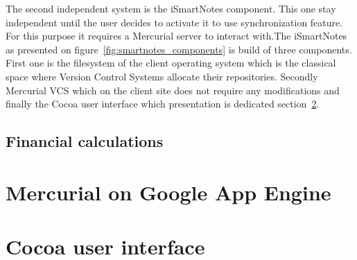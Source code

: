 The second independent system is the iSmartNotes component. This one stay independent until the user decides to activate it to use synchronization feature. For this purpose it requires a Mercurial server to interact with.The iSmartNotes as presented on figure~\ref{fig:smartnotes_components} is build of three components. First one is the filesystem of the client operating system which is the classical space where Version Control Systems allocate their repositories. Secondly Mercurial VCS which on the client site does not require any modifications and finally the Cocoa user interface which presentation is dedicated section~\ref{sec:cocoa}.

\subsection{Financial calculations}\label{subsec:gae_calculations}
\section{Mercurial on Google App Engine}\label{sec:hg_on_gae}
\section{Cocoa user interface}\label{sec:cocoa}
